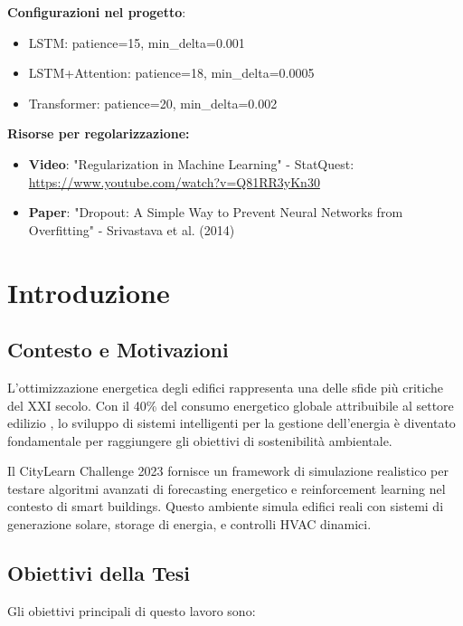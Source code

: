 \documentclass[12pt,a4paper,twoside]{report}
\begin{document}
\textbf{Configurazioni nel progetto}:
\begin{itemize}
    \item LSTM: patience=15, min\_delta=0.001
    \item LSTM+Attention: patience=18, min\_delta=0.0005
    \item Transformer: patience=20, min\_delta=0.002
\end{itemize}

\textbf{Risorse per regolarizzazione:}
\begin{itemize}
    \item \textbf{Video}: "Regularization in Machine Learning" - StatQuest: \url{https://www.youtube.com/watch?v=Q81RR3yKn30}
    \item \textbf{Paper}: "Dropout: A Simple Way to Prevent Neural Networks from Overfitting" - Srivastava et al. (2014)
\end{itemize}

\chapter{Introduzione}

\section{Contesto e Motivazioni}

L'ottimizzazione energetica degli edifici rappresenta una delle sfide più critiche del XXI secolo. Con il 40\% del consumo energetico globale attribuibile al settore edilizio \cite{iea2019}, lo sviluppo di sistemi intelligenti per la gestione dell'energia è diventato fondamentale per raggiungere gli obiettivi di sostenibilità ambientale.

Il CityLearn Challenge 2023 fornisce un framework di simulazione realistico per testare algoritmi avanzati di forecasting energetico e reinforcement learning nel contesto di smart buildings. Questo ambiente simula edifici reali con sistemi di generazione solare, storage di energia, e controlli HVAC dinamici.

\section{Obiettivi della Tesi}

Gli obiettivi principali di questo lavoro sono:
\end{document}
